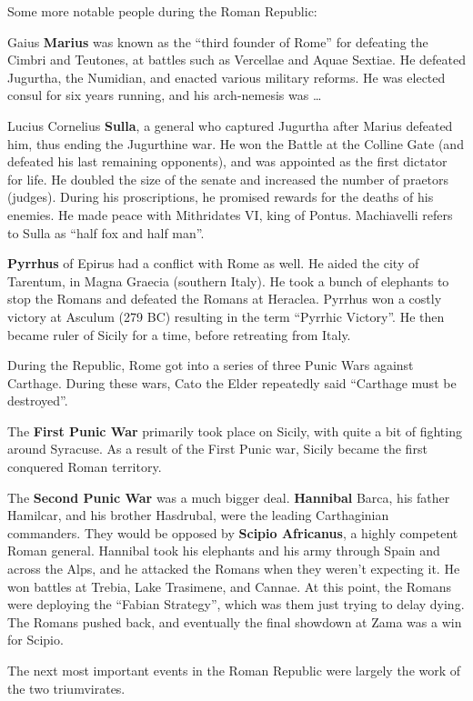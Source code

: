 Some more notable people during the Roman Republic:

Gaius \textbf{Marius} was known as the ``third founder of Rome'' for defeating the Cimbri and Teutones,
at battles such as Vercellae and Aquae Sextiae.
He defeated Jugurtha, the Numidian, and enacted various military reforms.
He was elected consul for six years running, and his arch-nemesis was \ldots

Lucius Cornelius \textbf{Sulla}, a general who captured Jugurtha after Marius defeated him,
thus ending the Jugurthine war.
He won the Battle at the Colline Gate (and defeated his last remaining opponents),
and was appointed as the first dictator for life.
He doubled the size of the senate and increased the number of praetors (judges).
During his proscriptions, he promised rewards for the deaths of his enemies.
He made peace with Mithridates VI, king of Pontus.
Machiavelli refers to Sulla as ``half fox and half man''.

\textbf{Pyrrhus} of Epirus had a conflict with Rome as well.
He aided the city of Tarentum, in Magna Graecia (southern Italy).
He took a bunch of elephants to stop the Romans and defeated the Romans at Heraclea.
Pyrrhus won a costly victory at Asculum (279 BC) resulting in the term ``Pyrrhic Victory''.
He then became ruler of Sicily for a time, before retreating from Italy.

During the Republic, Rome got into a series of three Punic Wars against Carthage.
During these wars, Cato the Elder repeatedly said ``Carthage must be destroyed''.

The \textbf{First Punic War} primarily took place on Sicily, with quite a bit of fighting around Syracuse.
As a result of the First Punic war, Sicily became the first conquered Roman territory.

The \textbf{Second Punic War} was a much bigger deal.
\textbf{Hannibal} Barca, his father Hamilcar, and his brother Hasdrubal, were the leading Carthaginian commanders.
They would be opposed by \textbf{Scipio Africanus}, a highly competent Roman general.
Hannibal took his elephants and his army through Spain and across the Alps,
and he attacked the Romans when they weren't expecting it.
He won battles at Trebia, Lake Trasimene, and Cannae.
At this point, the Romans were deploying the ``Fabian Strategy'', which was them just trying to delay dying.
The Romans pushed back, and eventually the final showdown at Zama was a win for Scipio.

The next most important events in the Roman Republic were largely the work of the two triumvirates.

